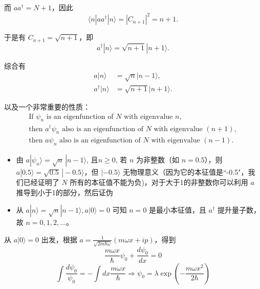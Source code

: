 而 $a a^\dag = N + 1$，因此
\begin{equation}
	\langle n | a a^\dag | n \rangle = | C_{n+1} |^{2} = n+1.
\end{equation}

于是有 $C_{n+1} = \sqrt{n+1}$，即
\begin{equation}
	a^\dag | n \rangle = \sqrt{n+1} | n+1 \rangle.
\end{equation}

综合有
\[
\boxed{
	\begin{aligned}
		a| n \rangle &= \sqrt{n}| n-1 \rangle, \\
		a^\dagger| n \rangle &= \sqrt{n+1}| n+1 \rangle.
	\end{aligned}
}
\]

以及一个非常重要的性质：
\[
\boxed{
	\begin{array}{c}
		\text{If } \psi_{n} \text{ is an eigenfunction of } N \text{ with eigenvalue } n,\\[6pt]
		\text{then } a^\dag \psi_{n} \text{ also is an eigenfunction of } N \text{ with eigenvalue } (n + 1),\\[6pt]
		\text{then } a\psi_{n} \text{ also is an eigenfunction of } N \text{ with eigenvalue } (n-1).
	\end{array}
}
\]

\begin{itemize}
	\item 由 $a|\psi_{n}\rangle = \sqrt{n}\,|n-1\rangle$, 且$n \ge 0 $, 若 $n$ 为非整数（如 $n=0.5$），则 $a|0.5\rangle = \sqrt{0.5}\,|-0.5\rangle$，但 $|-0.5\rangle$ 无物理意义（因为它的本征值是``-0.5"，我们已经证明了 $N$ 所有的本征值不能为负)，对于大于1的非整数你可以利用 $a$ 推导到小于1的部分，然后证伪
	\item 从 $a | n \rangle = \sqrt{n} | n-1 \rangle, a|0\rangle = 0$ 可知 $n=0$ 是最小本征值，且 $a^{\dagger}$ 提升量子数，故 $n=0,1,2,\dots$。
\end{itemize}

从 $a | 0 \rangle = 0$ 出发，根据 $\displaystyle a = \frac{1}{\sqrt{2m \hbar \omega}} (m \omega x + i p)$，得到
\begin{equation}
	\frac{m \omega x}{\hbar} \psi_{0} + \frac{d \psi_{0}}{dx} = 0
\end{equation}
\begin{equation}
	\int {\frac{{d{\psi _0}}}{{{\psi _0}}}}  =  - \int d x\frac{{m\omega x}}{\hbar } \Rightarrow {\psi _0} = \lambda \exp \left( { - \frac{{m\omega {x^2}}}{{2\hbar }}} \right)
\end{equation}


